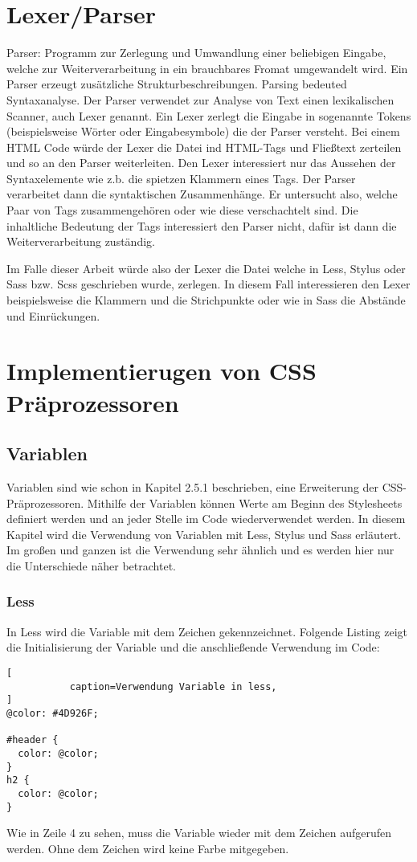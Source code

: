 \section{Lexer/Parser}
Parser: Programm zur Zerlegung und Umwandlung einer beliebigen Eingabe, welche zur Weiterverarbeitung in ein brauchbares Fromat umgewandelt wird. Ein Parser erzeugt zusätzliche Strukturbeschreibungen. Parsing bedeuted Syntaxanalyse. \newline
Der Parser verwendet zur Analyse von Text einen lexikalischen Scanner, auch Lexer genannt. Ein Lexer zerlegt die Eingabe in sogenannte Tokens (beispielsweise Wörter oder Eingabesymbole) die der Parser versteht. \newline
Bei einem HTML Code würde der Lexer die Datei ind HTML-Tags und Fließtext zerteilen und so an den Parser weiterleiten. Den Lexer interessiert nur das Aussehen der Syntaxelemente wie z.b. die spietzen Klammern eines Tags. Der Parser verarbeitet dann die syntaktischen Zusammenhänge. Er untersucht also, welche Paar von Tags zusammengehören oder wie diese verschachtelt sind. Die inhaltliche Bedeutung der Tags interessiert den Parser nicht, dafür ist dann die Weiterverarbeitung zuständig.

Im Falle dieser Arbeit würde also der Lexer die Datei welche in Less, Stylus oder Sass bzw. Scss geschrieben wurde, zerlegen. In diesem Fall interessieren den Lexer beispielsweise die Klammern und die Strichpunkte oder wie in Sass die Abstände und Einrückungen.
\newpage


\section{Implementierugen von CSS Präprozessoren}
\subsection{Variablen}
Variablen sind wie schon in Kapitel 2.5.1 beschrieben, eine Erweiterung der CSS-Präprozessoren. Mithilfe der Variablen können Werte am Beginn des Stylesheets definiert werden und an jeder Stelle im Code wiederverwendet werden. In diesem Kapitel wird die Verwendung von Variablen mit Less, Stylus und Sass erläutert. Im großen und ganzen ist die Verwendung sehr ähnlich und es werden hier nur die Unterschiede näher betrachtet.
\subsubsection{Less}
In Less wird die Variable mit dem Zeichen \glqq{} gekennzeichnet. Folgende Listing zeigt die Initialisierung der Variable und die anschließende Verwendung im Code:
\begin{lstlisting}[
           caption=Verwendung Variable in less,
]
@color: #4D926F;

#header {
  color: @color;
}
h2 {
  color: @color;
}
\end{lstlisting}
Wie in Zeile 4 zu sehen, muss die Variable wieder mit dem \glqq{} Zeichen aufgerufen werden. Ohne dem  \glqq{} Zeichen wird keine Farbe mitgegeben.
